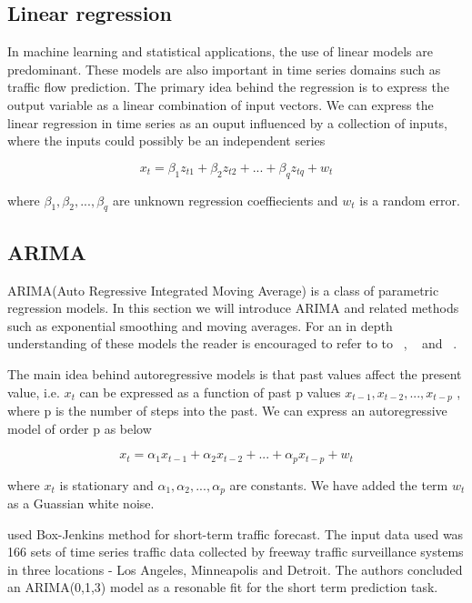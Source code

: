 \subsection{Linear regression}
In machine learning and statistical applications, the use of linear models are predominant. These
models are also important in time series domains such as traffic flow prediction. The primary
idea behind the regression is to express the output variable as a linear combination of input
vectors. We can express the linear regression in time series as an ouput influenced by a
collection of inputs, where the inputs could possibly be an independent series

        \begin{equation}
            x_{t} = \beta_{1}z_{t1} + \beta_{2}z_{t2} + ... + \beta_{q}z_{tq} + w_{t}
        \end{equation}

where $ \beta_{1}, \beta_{2},...,\beta_{q} $ are unknown regression coeffiecients and $w_{t}$ is
a random error.

\subsection{ARIMA}
ARIMA(Auto Regressive Integrated Moving Average) is a class of parametric regression models. In
this section we will introduce ARIMA and related methods such as exponential smoothing and moving
averages. For an in depth understanding of these models the reader is encouraged to refer to to
~\citet{tong1990non}, ~\citet{brockwell2006introduction} and ~\citet{box2015time}.

The main idea behind autoregressive models is that past values affect the present value, i.e.
$x_{t}$ can be expressed as a function of past p values $ x_{t-1}, x_{t-2},...,x_{t-p} $ , where
p is the number of steps into the past. We can express an autoregressive model of order p as below

        \begin{equation}
          x_{t} = \alpha_{1}x_{t-1} + \alpha_{2}x_{t-2} + ... + \alpha_{p}x_{t-p} + w_{t}
        \end{equation}

where $x_{t}$ is stationary and $ \alpha_{1}, \alpha_{2},..., \alpha_{p} $ are constants. We have
added the term $w_{t}$ as a Guassian white noise.


\citet{ahmed1979analysis} used Box-Jenkins method for short-term traffic forecast. The input data
used was 166 sets of time series traffic data collected by freeway traffic surveillance systems in
three locations - Los Angeles, Minneapolis and Detroit. The authors concluded an ARIMA(0,1,3) model
as a resonable fit for the short term prediction task.

